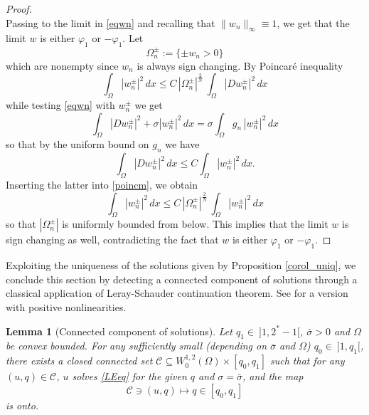 \documentclass[12pt]{amsart}
\numberwithin{equation}{section}
\theoremstyle{plain}
\newtheorem{lemma}[theorem]{Lemma}
\theoremstyle{plain}
\theoremstyle{plain}
\theoremstyle{definition}
\newcommand{\beq}{\begin{equation}}
\newcommand{\eeq}{\end{equation}}
\renewcommand{\le}{\leqslant}
\begin{document}
\begin{proof}
\[\]
Passing to the limit in \eqref{eqwn} and recalling that $\|w_n\|_\infty\equiv 1$, we get that the limit $w$ is either $\varphi_1$ or $-\varphi_1$.
Let 
\[
\Omega_n^{\pm}:=\{\pm w_n>0\}
\]
which are nonempty since $w_n$ is always sign changing. 
By Poincar\'e inequality
\beq
\label{poincm}
\int_{\Omega} \left|w_n^{\pm}\right|^2\, dx\le C\, \left|\Omega_n^{\pm}\right|^{\frac{2}{N}}\, \int_\Omega \left|Dw_n^{\pm}\right|^2\, dx
\eeq
while testing \eqref{eqwn} with $w_n^{\pm}$ we get
\[
\int_\Omega \left|Dw_n^{\pm}\right|^2+\sigma\left|w_n^{\pm}\right|^2\, dx=\sigma \int_\Omega g_n\, \left|w_n^{\pm}\right|^2\, dx
\]
so that by the uniform bound on $g_n$ we have
\[
\int_\Omega \left|Dw_n^{\pm}\right|^2\, dx\le C \int_\Omega \left|w_n^{\pm}\right|^2\, dx.
\]
Inserting the latter into \eqref{poincm}, we obtain
\[
\int_{\Omega} \left|w_n^{\pm}\right|^2\, dx\le C\, \left|\Omega_n^{\pm}\right|^{\frac{2}{N}}\, \int_{\Omega} \left|w_n^{\pm}\right|^2\, dx
\]
so that $|\Omega_n^{\pm}|$ is uniformly bounded from below. This implies that the limit $w$ is sign changing as well, contradicting the fact that $w$ is either $\varphi_1$ or $-\varphi_1$.
\end{proof}

Exploiting the uniqueness of the solutions given by Proposition \ref{corol_uniq}, we conclude this section by detecting a connected component of solutions through a classical application of Leray-Schauder continuation theorem. 
See \cite[Corollary 2.1]{DLN82} for a version with positive nonlinearities.

\begin{lemma}[Connected component of solutions] 
\label{lemmaconn}
Let $q_1\in \ ]1, 2^*-1[$, $\bar\sigma>0$ and $\Omega$ be convex bounded. 
For any sufficiently small (depending on $\bar \sigma$ and $\Omega$) $q_0\in \ ]1, q_1[$, there exists a closed connected set ${\mathcal C}\subseteq W^{1,2}_0(\Omega)\times [q_0, q_1]$ such that for any $(u, q)\in {\mathcal C}$, $u$ solves \eqref{LEeq} for the given $q$ and $\sigma=\bar\sigma$, and the map 
\[
{\mathcal C}\ni (u, q)\mapsto q\in [q_0, q_1]
\]
 is onto.
\end{lemma}
\end{document}
